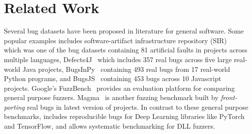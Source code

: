 \documentclass[sigconf,screen]{acmart}
\begin{document}



\vspace{-1ex}
\section{Related Work} 

Several bug datasets have been proposed in literature for general
software. Some popular examples includes software-artifact
infrastructure repository (SIR)~\cite{do2005supporting} which was one
of the bug datasets containing 81 artificial faults in projects across
multiple languages, Defects4J~\cite{just2014defects4j} which includes
357 real bugs across five large real-world Java projects,
BugsInPy~\cite{widyasari2020bugsinpy} containing 493 real bugs from 17
real-world Python programs, and BugsJS~\cite{vancsics2020relationship}
containing 453 bugs across 10 Javascript projects.
%
Google's FuzzBench~\cite{metzman2021fuzzbench} provides an evaluation platform
for comparing general purpose fuzzers. Magma~\cite{hazimeh2020magma} is another
fuzzing benchmark built by \emph{front-porting} real bugs in latest version of
projects. In contrast to these general purpose benchmarks, \tname includes
reproducible bugs for Deep Learning libraries like PyTorch and TensorFlow, and
allows systematic benchmarking for DLL fuzzers. 
\end{document}

